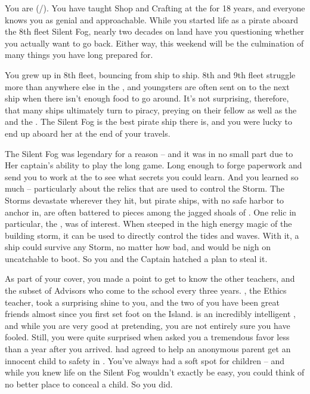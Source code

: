 \documentclass[char]{GL2020}
\begin{document}
\name{\cPirate{}}


You are \cPirate{\full} (\cPirate{\they}/\cPirate{\them}). You have taught Shop and Crafting at the \pSchool{} for 18 years, and everyone knows you as genial and approachable. While you started life as a pirate aboard the 8th fleet Silent Fog, nearly two decades on land have you questioning whether you actually want to go back. Either way, this weekend will be the culmination of many things you have long prepared for.

You grew up in 8th fleet, bouncing from ship to ship. 8th and 9th fleet struggle more than anywhere else in the \pShip{}, and youngsters are often sent on to the next ship when there isn't enough food to go around. It's not surprising, therefore, that many ships ultimately turn to piracy, preying on their fellow \pShippies{} as well as the \pFarm{} and the \pTech{}. The Silent Fog is the best pirate ship there is, and you were lucky to end up aboard her at the end of your travels.

The Silent Fog was legendary for a reason -- and it was in no small part due to Her captain's ability to play the long game. Long enough to forge paperwork and send you to work at the \pSchool{} to see what secrets you could learn. And you learned so much -- particularly about the relics that are used to control the Storm. The Storms devastate wherever they hit, but pirate ships, with no safe harbor to anchor in, are often battered to pieces among the jagged shoals of \pWod{}. One relic in particular, the \iNet{}, was of interest. When steeped in the high energy magic of the building storm, it can be used to directly control the tides and waves. With it, a ship could survive any Storm, no matter how bad, and would be nigh on uncatchable to boot. So you and the Captain hatched a plan to steal it.

As part of your cover, you made a point to get to know the other teachers, and the subset of Advisors who come to the school every three years. \cEthics{}, the Ethics teacher, took a surprising shine to you, and the two of you have been great friends almost since you first set foot on the Island. \cEthics{} is an incredibly intelligent \cEthics{\person}, and while you are very good at pretending, you are not entirely sure you have \cEthics{\them} fooled.
%
Still, you were quite surprised when \cEthics{\they} asked you a tremendous favor less than a year after you arrived. \cEthics{} had agreed to help an anonymous parent get an innocent child to safety in \pShip{}. You've always had a soft spot for children -- and while you knew life on the Silent Fog wouldn't exactly be easy, you could think of no better place to conceal a child. So you did.
\end{document}
